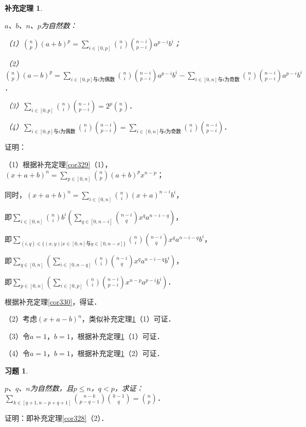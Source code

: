 \documentclass[12pt, a4paper, oneside]{book}
\newtheorem{cor}{补充定理}
\newtheorem{exer}{习题}
\begin{document}
			\begin{cor}\label{cor331}
				\hfill\par
				$a$、$b$、$n$、$p$为自然数：
				\par
				（1）$\binom{n}{p}(a+b)^p=\sum\limits_{i\in [0, p]}\binom{n}{i}\binom{n-i}{p-i}a^{p-i}b^i$；
				\par
				（2）$\binom{n}{p}(a-b)^p=\sum\limits_{i\in[0, p]\text{与}i\text{为偶数}}\binom{n}{i}\binom{n-i}{p-i}a^{p-i}b^i-\sum\limits_{i\in[0, n]\text{与}i\text{为奇数}}\binom{n}{i}\binom{n-i}{p-i}a^{p-i}b^i$．
				\par
				（3）$\sum\limits_{i\in [0, p]}\binom{n}{i}\binom{n-i}{p-i}=2^p\binom{n}{p}$．
				\par
				（4）$\sum\limits_{i\in[0, p]\text{与}i\text{为偶数}}\binom{n}{i}\binom{n-i}{p-i}=\sum\limits_{i\in[0, n]\text{与}i\text{为奇数}}\binom{n}{i}\binom{n-i}{p-i}$．
			\end{cor}
			证明：
			\par
			（1）根据补充定理\ref{cor329}（1），$(x+a+b)^n=\sum\limits_{p\in [0, n]}\binom{n}{p}(a+b)^px^{n-p}$；
			\par
			同时，$(x+a+b)^n=\sum\limits_{i\in [0, n]}\binom{n}{i}(x+a)^{n-i}b^i$，
			\par
			即$\sum\limits_{i\in [0, n]}\binom{n}{i}b^i(\sum\limits_{q\in [0, n-i]}\binom{n-i}{q}x^qa^{n-i-q})$，
			\par
			即$\sum\limits_{(i, q)\in \{(x, y)|x\in [0, n]\text{与}y\in [0, n-x]\}}\binom{n}{i}\binom{n-i}{q}x^qa^{n-i-q}b^i$，
			\par
			即$\sum\limits_{q\in [0, n]}(\sum\limits_{i\in [0, n-q]}\binom{n}{i}\binom{n-i}{q}x^qa^{n-i-q}b^i)$，
			\par
			即$\sum\limits_{p\in [0, n]}(\sum\limits_{i\in [0, p]}\binom{n}{i}\binom{n-i}{p-i}x^{n-p}a^{p-i}b^i)$．
			\par
			根据补充定理\ref{cor330}，得证．
			\par
			（2）考虑$(x+a-b)^n$，类似补充定理\ref{cor331}（1）可证．
			\par
			（3）令$a=1$，$b=1$，根据补充定理\ref{cor331}（1）可证．
			\par
			（4）令$a=1$，$b=1$，根据补充定理\ref{cor331}（2）可证．

			\begin{exer}\label{exer138}
				\hfill\par
				$p$、$q$、$n$为自然数，且$p\leq n$，$q<p$，求证：$\sum\limits_{k\in [q+1, n-p+q+1]}\binom{n-k}{p-q-1}\binom{k-1}{q}=\binom{n}{p}$．
			\end{exer}
			证明：即补充定理\ref{cor328}（2）．
			
\end{document}
